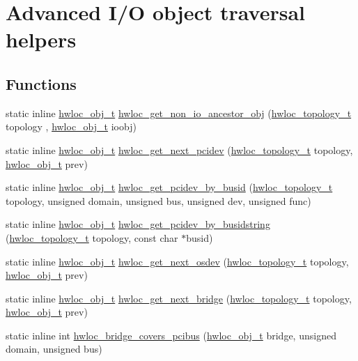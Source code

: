 \hypertarget{a00064}{
\section{Advanced I/O object traversal helpers}
\label{a00064}
}
\subsection*{Functions}
\begin{DoxyCompactItemize}
\item 
static inline \hyperlink{a00016}{hwloc\_\-obj\_\-t} \hyperlink{a00064_ga3603275746a8792e54415d79763aa9e9}{hwloc\_\-get\_\-non\_\-io\_\-ancestor\_\-obj} (\hyperlink{a00039_ga9d1e76ee15a7dee158b786c30b6a6e38}{hwloc\_\-topology\_\-t} topology , \hyperlink{a00016}{hwloc\_\-obj\_\-t} ioobj)
\item 
static inline \hyperlink{a00016}{hwloc\_\-obj\_\-t} \hyperlink{a00064_gad6e1ed122ef3b6e098538d75acd5e3f6}{hwloc\_\-get\_\-next\_\-pcidev} (\hyperlink{a00039_ga9d1e76ee15a7dee158b786c30b6a6e38}{hwloc\_\-topology\_\-t} topology, \hyperlink{a00016}{hwloc\_\-obj\_\-t} prev)
\item 
static inline \hyperlink{a00016}{hwloc\_\-obj\_\-t} \hyperlink{a00064_ga546e1d690c63fb24177f3013ed78ceb1}{hwloc\_\-get\_\-pcidev\_\-by\_\-busid} (\hyperlink{a00039_ga9d1e76ee15a7dee158b786c30b6a6e38}{hwloc\_\-topology\_\-t} topology, unsigned domain, unsigned bus, unsigned dev, unsigned func)
\item 
static inline \hyperlink{a00016}{hwloc\_\-obj\_\-t} \hyperlink{a00064_ga9d5643f2e337fe1b98e7cce5c1ecb74e}{hwloc\_\-get\_\-pcidev\_\-by\_\-busidstring} (\hyperlink{a00039_ga9d1e76ee15a7dee158b786c30b6a6e38}{hwloc\_\-topology\_\-t} topology, const char $\ast$busid)
\item 
static inline \hyperlink{a00016}{hwloc\_\-obj\_\-t} \hyperlink{a00064_ga73a5bc6265642e6001f7a10812ab886d}{hwloc\_\-get\_\-next\_\-osdev} (\hyperlink{a00039_ga9d1e76ee15a7dee158b786c30b6a6e38}{hwloc\_\-topology\_\-t} topology, \hyperlink{a00016}{hwloc\_\-obj\_\-t} prev)
\item 
static inline \hyperlink{a00016}{hwloc\_\-obj\_\-t} \hyperlink{a00064_ga2bd3f856d0fc3c6c02642c17d763b823}{hwloc\_\-get\_\-next\_\-bridge} (\hyperlink{a00039_ga9d1e76ee15a7dee158b786c30b6a6e38}{hwloc\_\-topology\_\-t} topology, \hyperlink{a00016}{hwloc\_\-obj\_\-t} prev)
\item 
static inline int \hyperlink{a00064_gaef22d6bf5cb0b7f13a863780126a8cb7}{hwloc\_\-bridge\_\-covers\_\-pcibus} (\hyperlink{a00016}{hwloc\_\-obj\_\-t} bridge, unsigned domain, unsigned bus)

\end{DoxyCompactItemize}
